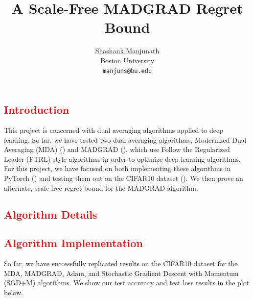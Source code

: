 \documentclass{article}
\title{A Scale-Free MADGRAD Regret Bound}
\author{
  Shashank Manjunath \\
  Boston University \\
  \texttt{manjuns@bu.edu} \\
}
\newcommand{\todo}[1]{\textcolor{red}{#1}}
\begin{document}
\maketitle

\todo{\section{Introduction}}

This project is concerned with dual averaging algorithms applied to deep learning. So far, we have tested two dual
averaging algorithms, Modernized Dual Averaging (MDA) (\cite{jelassi_dual_2020}) and MADGRAD
(\cite{defazio_adaptivity_nodate}), which use Follow the Regularized Leader (FTRL) style algorithms in order to optimize
deep learning algorithms. For this project, we have focused on both implementing these algorithms in PyTorch
(\cite{paszke_pytorch_2019}) and testing them out on the CIFAR10 dataset (\cite{krizhevsky_learning_nodate}). We then
prove an alternate, scale-free regret bound for the MADGRAD algorithm.

\todo{\section{Algorithm Details}}

\todo{\section{Algorithm Implementation}}

So far, we have successfully replicated results on the CIFAR10 dataset for the MDA, MADGRAD, Adam, and Stochastic
Gradient Descent with Momentum (SGD+M) algorithms. We show our test accuracy and test loss results in the plot below.
\end{document}
